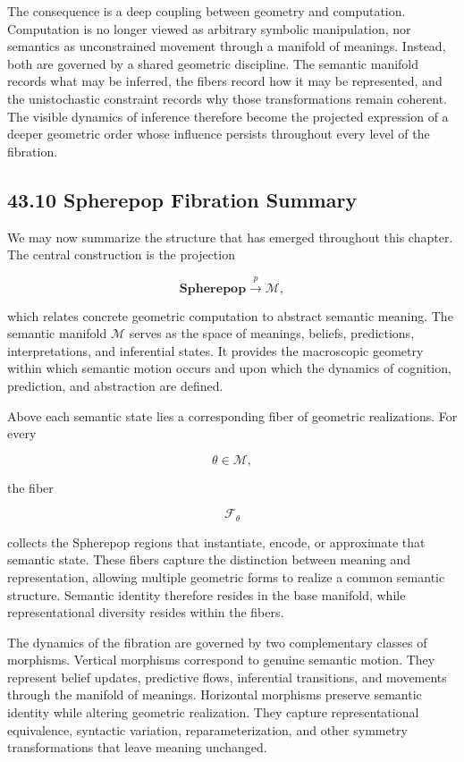 \documentclass[12pt,letterpaper]{article}
\theoremstyle{remark}
\begin{document}
The consequence is a deep coupling between geometry and computation. Computation is no longer viewed as arbitrary symbolic manipulation, nor semantics as unconstrained movement through a manifold of meanings. Instead, both are governed by a shared geometric discipline. The semantic manifold records what may be inferred, the fibers record how it may be represented, and the unistochastic constraint records why those transformations remain coherent. The visible dynamics of inference therefore become the projected expression of a deeper geometric order whose influence persists throughout every level of the fibration.

\subsection{43.10 Spherepop Fibration Summary}

We may now summarize the structure that has emerged throughout this chapter. The central construction is the projection

\[
\mathbf{Spherepop}
\xrightarrow{p}
\mathcal{M},
\]

which relates concrete geometric computation to abstract semantic meaning. The semantic manifold $\mathcal{M}$ serves as the space of meanings, beliefs, predictions, interpretations, and inferential states. It provides the macroscopic geometry within which semantic motion occurs and upon which the dynamics of cognition, prediction, and abstraction are defined.

Above each semantic state lies a corresponding fiber of geometric realizations. For every

\[
\theta \in \mathcal{M},
\]

the fiber

\[
\mathcal{F}_{\theta}
\]

collects the Spherepop regions that instantiate, encode, or approximate that semantic state. These fibers capture the distinction between meaning and representation, allowing multiple geometric forms to realize a common semantic structure. Semantic identity therefore resides in the base manifold, while representational diversity resides within the fibers.

The dynamics of the fibration are governed by two complementary classes of morphisms. Vertical morphisms correspond to genuine semantic motion. They represent belief updates, predictive flows, inferential transitions, and movements through the manifold of meanings. Horizontal morphisms preserve semantic identity while altering geometric realization. They capture representational equivalence, syntactic variation, reparameterization, and other symmetry transformations that leave meaning unchanged.
\end{document}
